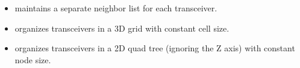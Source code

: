 \begin{itemize}
        \item {} maintains a separate neighbor list for each transceiver.
        \item {} organizes transceivers in a 3D grid with constant cell size.
        \item {} organizes transceivers in a 2D quad tree (ignoring the Z axis) with constant node size.
\end{itemize}


